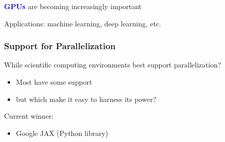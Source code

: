 \documentclass[
    xcolor={svgnames,dvipsnames},
    hyperref={colorlinks, citecolor=DeepPink4, linkcolor=DarkRed, urlcolor=DarkBlue}
    ]{beamer}  %
\newcommand{\navy}[1]{\textcolor{Blue}{\bf #1}}
\newcommand{\1}{\mathbbm 1}
\begin{document}
\begin{frame}

    \navy{GPUs} are becoming increasingly important


    \begin{figure}
       \begin{center}
       \end{center}
    \end{figure}

    \vspace{0.5em}

    Applications: machine learning, deep learning, etc.
    

\end{frame}



\begin{frame}
    \frametitle{Support for Parallelization}
    
    While scientific computing environments best support parallelization?

        \vspace{0.5em}
        \vspace{0.5em}
    \begin{itemize}
        \item Most have some support
        \vspace{0.5em}
        \item but which make it easy to harness its power?
    \end{itemize}

    \vspace{0.5em}
    \vspace{0.5em}

    Current winner:
    \begin{itemize}
        \item Google JAX (Python library)
            \vspace{0.5em}
    \end{itemize}

\end{frame}
\end{document}
